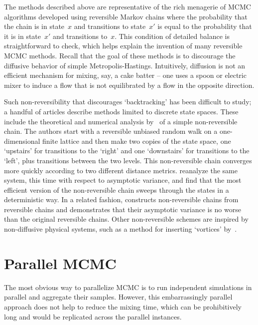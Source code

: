 \documentclass[angelino.tex]{subfiles}
\begin{document}
The methods described above are representative of the rich menagerie of MCMC algorithms 
developed using reversible Markov chains where the probability that the chain
is in state~$x$ and transitions to state~$x'$ is equal to the probability that
it is in state~$x'$ and transitions to~$x$.
This condition of detailed balance is straightforward to check, which helps
explain the invention of many reversible MCMC methods.
Recall that the goal of these methods is to discourage the
diffusive behavior of simple Metropolis-Hastings.
Intuitively, diffusion is not an efficient mechanism for mixing, say, a cake
batter -- one uses a spoon or electric mixer to induce a flow that is not
equilibrated by a flow in the opposite direction.

Such non-reversibility that discourages `backtracking' has been difficult to
study; a handful of articles describe methods limited to discrete state spaces.
These include the theoretical and numerical analysis 
by~\citet{diaconis:2000-non-reversible} of a simple non-reversible chain.
The authors start with a reversible unbiased random walk on a one-dimensional
finite lattice and then make two copies of the state space,
one `upstairs' for transitions to the `right' and
one `downstairs' for transitions to the `left',
plus transitions between the two levels.
This non-reversible chain converges more quickly
according to two different distance metrics.
\citet{geyer:2000-non-reversible} reanalyze the same system, this time with
respect to asymptotic variance, and find that the most efficient version of the 
non-reversible chain sweeps through the states in a deterministic way.
In a related fashion, \citet{neal:2004-non-reversible} constructs non-reversible 
chains from reversible chains and demonstrates that their asymptotic variance is
no worse than the original reversible chains.
Other non-reversible schemes are inspired by non-diffusive physical systems,
such as a method for inserting `vortices' by~\citet{sun:2010-vortices}.


\section{Parallel MCMC}

The most obvious way to parallelize MCMC is to run independent simulations in
parallel and aggregate their samples.
However, this embarrassingly parallel approach does not help to reduce the
mixing time, which can be prohibitively long and would be replicated across
the parallel instances.
\end{document}
